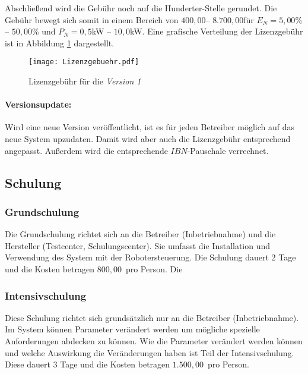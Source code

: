 Abschließend wird die Gebühr noch auf die Hunderter-Stelle gerundet. Die Gebühr bewegt sich somit in einem Bereich von $400,00$\officialeuro -- $8.700,00$\officialeuro für $E_N = 5,00$\% -- $50,00$\% und $P_N = 0,5$kW -- $10,0$kW. Eine grafische Verteilung der Lizenzgebühr ist in Abbildung \ref{fig:lizenzgebuehr} dargestellt.

\begin{figure}[h]
	\centering
	\texttt{[image: Lizenzgebuehr.pdf]}
	\caption{Lizenzgebühr für die \textit{Version 1}}
	\label{fig:lizenzgebuehr}
\end{figure}

\paragraph*{Versionsupdate:}
Wird eine neue Version veröffentlicht, ist es für jeden Betreiber möglich auf das neue System upzudaten. Damit wird aber auch die Lizenzgebühr entsprechend angepasst. Außerdem wird die entsprechende $IBN$-Pauschale verrechnet.

\subsection{Schulung}
\subsubsection{Grundschulung}
Die Grundschulung richtet sich an die Betreiber (Inbetriebnahme) und die Hersteller (Testcenter, Schulungscenter). Sie umfasst die Installation und Verwendung des System mit der Robotersteuerung. Die Schulung dauert 2 Tage und die Kosten betragen $800,00$\officialeuro~pro Person. Die 

\subsubsection{Intensivschulung}
Diese Schulung richtet sich grundsätzlich nur an die Betreiber (Inbetriebnahme). Im System können Parameter verändert werden um mögliche spezielle Anforderungen abdecken zu können. Wie die Parameter verändert werden können und welche Auswirkung die Veränderungen haben ist Teil der Intensivschulung. Diese dauert 3 Tage und die Kosten betragen $1.500,00$\officialeuro~pro Person.

